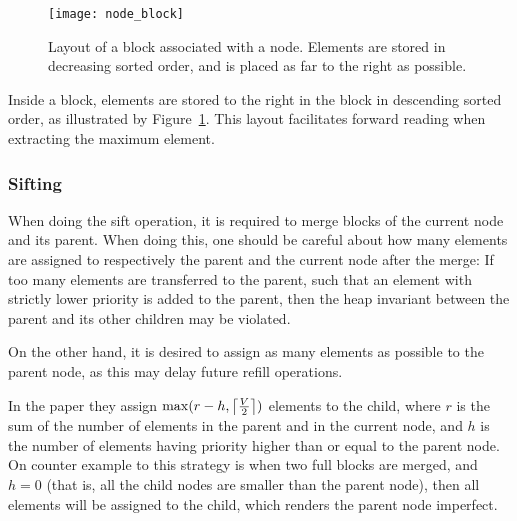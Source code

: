 \begin{figure}
  \centering
  \texttt{[image: node\_block]}
  \caption{Layout of a block associated with a node. Elements are
    stored in decreasing sorted order, and is placed as far to the
    right as possible.}
  \label{fig:node-block}
\end{figure}

Inside a block, elements are stored to the right in the block in
descending sorted order, as illustrated by
Figure~\ref{fig:node-block}. This layout facilitates forward reading
when extracting the maximum element.

\subsubsection{Sifting}
\label{sec:heap:sifting}
When doing the sift operation, it is required to merge blocks of the
current node and its parent. When doing this, one should be careful
about how many elements are assigned to respectively the parent and
the current node after the merge: If too many elements are transferred
to the parent, such that an element with strictly lower priority is
added to the parent, then the heap invariant between the parent and
its other children may be violated.

On the other hand, it is desired to assign as many elements as
possible to the parent node, as this may delay future refill
operations.

In the paper they assign $\max(r - h, \ceil*{\frac{V}{2}})$ elements to
the child, where $r$ is the sum of the number of elements in the
parent and in the current node, and $h$ is the number of elements
having priority higher than or equal to the parent node. On counter
example to this strategy is when two full blocks are merged, and $h =
0$ (that is, all the child nodes are smaller than the parent node),
then all elements will be assigned to the child, which renders the
parent node imperfect.

